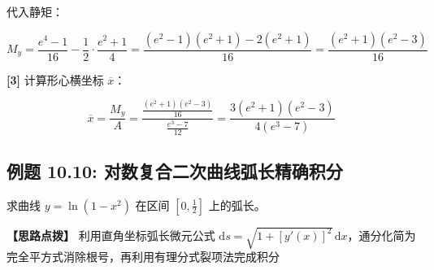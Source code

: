 \documentclass[11pt,a4paper,UTF8]{ctexart}
\begin{document}
\begin{solbox}[分步推导与答题规范]
代入静矩：


\begin{equation*}
M_y = \frac{e^4-1}{16} - \frac{1}{2} \cdot \frac{e^2+1}{4} = \frac{(e^2-1)(e^2+1) - 2(e^2+1)}{16} = \frac{(e^2+1)(e^2-3)}{16}
\end{equation*}


\textbf{[3]} 计算形心横坐标 $\overline{x}$：


\begin{equation*}
\overline{x} = \frac{M_y}{A} = \frac{\frac{(e^2+1)(e^2-3)}{16}}{\frac{e^3-7}{12}} = \frac{3(e^2+1)(e^2-3)}{4(e^3-7)}
\end{equation*}

\end{solbox}


\subsection{例题 10.10: 对数复合二次曲线弧长精确积分}

求曲线 $y = \ln(1-x^2)$ 在区间 $\left[0, \frac{1}{2}\right]$ 上的弧长。

\textbf{\color{DeepPurple}【思路点拨】} 利用直角坐标弧长微元公式 $\mathrm{d}s = \sqrt{1+[y'(x)]^2}\,\mathrm{d}x$，通分化简为完全平方式消除根号，再利用有理分式裂项法完成积分
\end{document}
